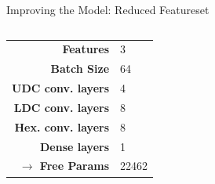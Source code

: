 \begin{frame}{Improving the Model: Reduced Featureset}
    \begin{columns}
        \begin{column}{.35\textwidth}
            \begin{tabular}{>{\small\bf}r l}
                \toprule
                Features                  & 3         \\
                Batch Size                & 64        \\
                UDC conv. layers          & 4         \\
                LDC conv. layers          & 8         \\
                Hex. conv. layers         & 8         \\
                Dense layers              & 1\times50 \\
                $\rightarrow$ Free Params & 22462     \\
                \bottomrule
            \end{tabular}
        \end{column}
        \begin{column}{.65\textwidth}
\end{column}
\end{columns}
\end{frame}
